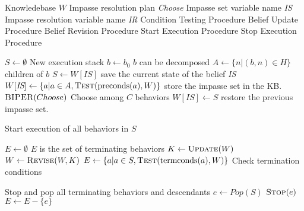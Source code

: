 
\begin{algorithmic}[1]
\small

\Require Knowledebase $W$
\Require Impasse resolution plan \textit{Choose}
\Require Impasse set variable name \textit{IS}
\Require Impasse resolution variable name \textit{IR}
\Require Condition Testing Procedure 
\Require Belief Update Procedure 
\Require Belief Revision Procedure 
\Require Start Execution Procedure 
\Require Stop Execution Procedure 

\Statex


\State $S\gets\emptyset$ \Comment New execution stack
\State $b\gets b_0$
\State {} \label{alg:ibc:push}
 \Comment $b$ can be decomposed \label{alg:ibc:allocate}
  \State $A\gets \{n | (b,n)\in H\}$  \Comment children of $b$
  \State $S\gets W[\textit{IS}]$ \Comment save the current state of the belief \textit{IS}
  \State $W[\textit{IS}]\gets \{a | a\in A, \Call{Test}{\pre(a),W}\}$ \Comment store the impasse set in the KB.
  \State $\Call{BIPER}{Choose}$ \label{alg:ibc:choose-allocate}\Comment Choose among $C$ behaviors
  \State $W[\textit{IS}]\gets S$ \Comment restore the previous impasse set.
  \State {}
\EndWhile \label{alg:ibc:push-end}

\Statex

\label{alg:ibc:exec} \Comment Start execution of all behaviors in $S$
   
\EndFor

\Statex 

\State $E\gets\emptyset$ \label{alg:ibc:monitor-exec}
 \Comment $E$ is the set of terminating behaviors
  \State $K\gets\Call{Update}{W}$
  \State $W\gets\Call{Revise}{W,K}$
  \State $E\gets \{a | a\in S, \Call{Test}{\term(a),W}\}$ \Comment Check termination conditions
\EndWhile  \label{alg:ibc:exec-end}

\Statex

 \label{alg:ibc:terminate} \Comment Stop and pop all terminating behaviors and descendants
  \State $e\gets Pop(S)$
  \State $\Call{Stop}{e}$
    \State $E\gets E-\{e\}$
  \EndIf
\EndWhile \label{alg:ibc:terminate-end}

\Statex


\end{algorithmic}
